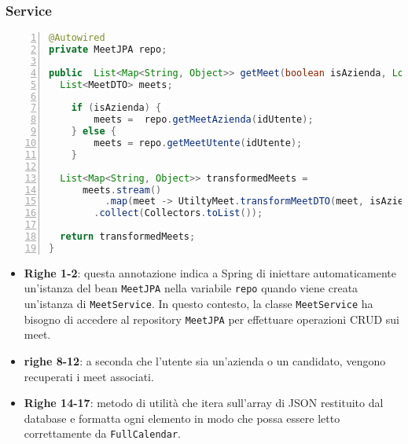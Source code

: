 \subsubsection{Service}
\begin{lstlisting}[language=java, frame=lines, basicstyle=\ttfamily\scriptsize, numbers=left]
@Autowired
private MeetJPA repo;

public  List<Map<String, Object>> getMeet(boolean isAzienda, Long idUtente) {
  List<MeetDTO> meets;

	if (isAzienda) {
		meets =  repo.getMeetAzienda(idUtente);
	} else {
		meets = repo.getMeetUtente(idUtente);
	}

  List<Map<String, Object>> transformedMeets = 
      meets.stream()
		  .map(meet -> UtiltyMeet.transformMeetDTO(meet, isAzienda))
        .collect(Collectors.toList());

  return transformedMeets;
}
\end{lstlisting}
\begin{itemize}
    \item \textbf{Righe 1-2}: questa annotazione indica a Spring di iniettare automaticamente un'istanza del bean \texttt{MeetJPA}
    nella variabile \texttt{repo} quando viene creata un'istanza di \texttt{MeetService}. \cite{AutoWiredSpring}
    In questo contesto, la classe \texttt{MeetService} ha bisogno di accedere al repository \texttt{MeetJPA} per effettuare
    operazioni CRUD sui meet.

    \item \textbf{righe 8-12}: a seconda che l'utente sia un'azienda o un candidato, vengono recuperati i meet associati.
    
    \item \textbf{Righe 14-17}: metodo di utilità che itera sull'array di JSON restituito dal
    database e formatta ogni elemento in modo che possa essere letto correttamente da \texttt{FullCalendar}.
\end{itemize}
